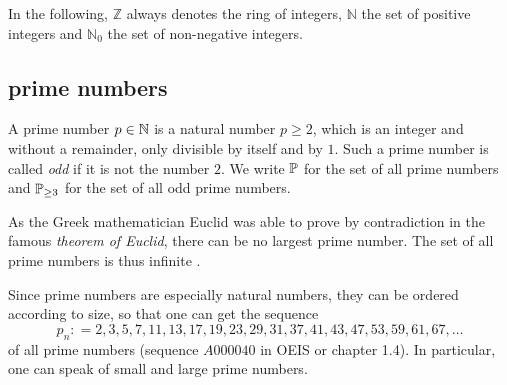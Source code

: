 In the following, $\mathbb{Z} $ always denotes the ring of integers, $\mathbb{N}$ the set of positive integers and $\mathbb{N}_0$ the set of non-negative integers.

\subsection{prime numbers}
A prime number $ p \in \mathbb{N} $ is a natural number $ p \geq 2 $, which is an integer and without a remainder, only divisible by itself and by $ 1 $. Such a prime number is called \textit{odd} if it is not the number $ 2 $. We write $ \mathbb{P} $ for the set of all prime numbers and $ \mathbb{P} _{\geq 3} $ for the set of all odd prime numbers.

As the Greek mathematician Euclid was able to prove by contradiction in the famous \textit{theorem of Euclid}, there can be no largest prime number. The set of all prime numbers is thus infinite \cite{AL}.

Since prime numbers are especially natural numbers, they can be ordered according to size, so that one can get the sequence
\begin{equation}
\label{eq: primenumber_sequence}
p_n: = 2, 3, 5, 7, 11, 13, 17, 19, 23, 29, 31, 37, 41, 43, 47, 53, 59, 61, 67, \ldots
\end{equation}
of all prime numbers (sequence $ A000040 $ in OEIS or \cite{HW} chapter 1.4). In particular, one can speak of small and large prime numbers.

